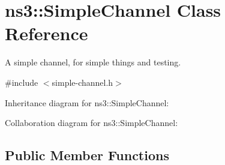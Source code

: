 \hypertarget{classns3_1_1SimpleChannel}{}\section{ns3\+:\+:Simple\+Channel Class Reference}
\label{classns3_1_1SimpleChannel}


A simple channel, for simple things and testing.  




{\ttfamily \#include $<$simple-\/channel.\+h$>$}



Inheritance diagram for ns3\+:\+:Simple\+Channel\+:


Collaboration diagram for ns3\+:\+:Simple\+Channel\+:
\subsection*{Public Member Functions}
